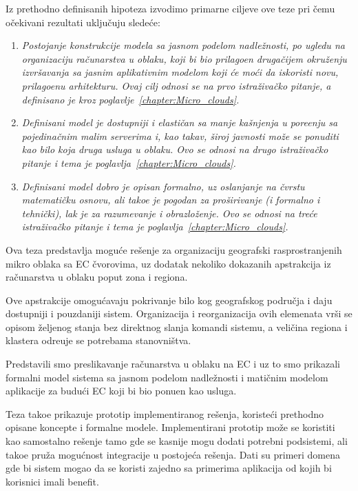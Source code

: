 Iz prethodno definisanih hipoteza izvodimo primarne ciljeve ove teze pri \v cemu o\v cekivani rezultati uklju\v cuju slede\'ce:

\begin{enumerate}[start=1,label={(\bfseries \arabic*)}]
	\item \textit{Postojanje konstrukcije modela sa jasnom podelom nadle\v znosti, po ugledu na organizaciju ra\v cunarstva u oblaku, koji bi bio prilago\dj en druga\v cijem okru\v zenju izvr\v savanja sa jasnim aplikativnim modelom koji \'ce mo\'ci da iskoristi novu, prilago\dj enu arhitekturu. Ovaj cilj odnosi se na prvo istra\v ziva\v cko pitanje, a definisano je kroz poglavlje~\ref{chapter:Micro_clouds}.}
	\item \textit{Definisani model je dostupniji i elasti\v can sa manje ka\v snjenja u pore\dj enju sa pojedina\v cnim malim serverima i, kao takav, \v siroj javnosti mo\v ze se ponuditi kao bilo koja druga usluga u oblaku. Ovo se odnosi na drugo istra\v ziva\v cko pitanje i tema je poglavlja~\ref{chapter:Micro_clouds}.}
	\item \textit{Definisani model dobro je opisan formalno, uz oslanjanje na \v cvrstu matemati\v cku osnovu, ali tako\dj e je pogodan za pro\v sirivanje (i formalno i tehni\v cki), lak je za razumevanje i obrazlo\v zenje. Ovo se odnosi na tre\'ce istra\v ziva\v cko pitanje i tema je poglavlja~\ref{chapter:Micro_clouds}.}
\end{enumerate}

\noindent
Ova teza predstavlja mogu\'ce re\v senje za organizaciju geografski rasprostranjenih mikro oblaka sa EC \v cvorovima, uz dodatak nekoliko dokazanih apstrakcija iz ra\v cunarstva u oblaku poput zona i regiona.

Ove apstrakcije omogu\'cavaju pokrivanje bilo kog geografskog podru\v cja i daju dostupniji i pouzdaniji sistem. Organizacija i reorganizacija ovih elemenata vr\v si se opisom \v zeljenog stanja bez direktnog slanja komandi sistemu, a veli\v cina regiona i klastera odre\dj uje se potrebama stanovni\v stva.

Predstavili smo preslikavanje ra\v cunarstva u oblaku na EC i uz to smo prikazali formalni model sistema sa jasnom podelom nadle\v znosti i mati\v cnim modelom aplikacije za budu\'ci EC koji bi bio ponu\dj en kao usluga. 

Teza tako\dj e prikazuje prototip implementiranog re\v senja, koriste\'ci prethodno opisane koncepte i formalne modele. Implementirani prototip mo\v ze se koristiti kao samostalno re\v senje tamo gde se kasnije mogu dodati potrebni podsistemi, ali tako\dj e pru\v za mogu\'cnost integracije u postoje\'ca re\v senja. Dati su primeri domena gde bi sistem mogao da se koristi zajedno sa primerima aplikacija od kojih bi korisnici imali benefit. 


